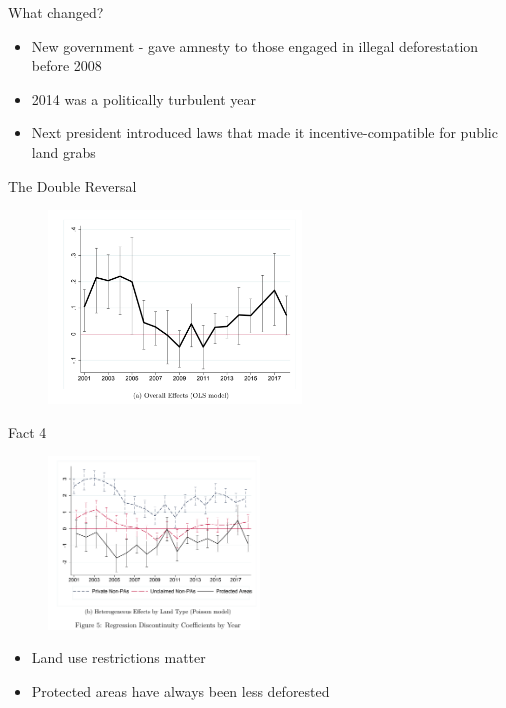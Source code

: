 \documentclass[11pt,notes=hide,aspectratio=169,mathserif]{beamer}
\begin{document}
\begin{frame}{What changed?}
\begin{itemize}
\item New government - gave amnesty to those engaged in illegal deforestation before 2008
\item 2014 was a politically turbulent year
\item Next president introduced laws that made it incentive-compatible for public land grabs
\end{itemize}
\end{frame}

\begin{frame}{The Double Reversal}
\begin{figure}
\centering
\includegraphics[width=0.6\textwidth]{inputs/reversal.png}
\end{figure}
\end{frame}

\begin{frame}{Fact 4}
\begin{figure}
\centering
\includegraphics[width=0.5\textwidth]{inputs/fig_land_use.png}
\end{figure}
\begin{itemize}
\item Land use restrictions matter 
\item Protected areas have always been less deforested
\end{itemize}
\end{frame}
\end{document}
